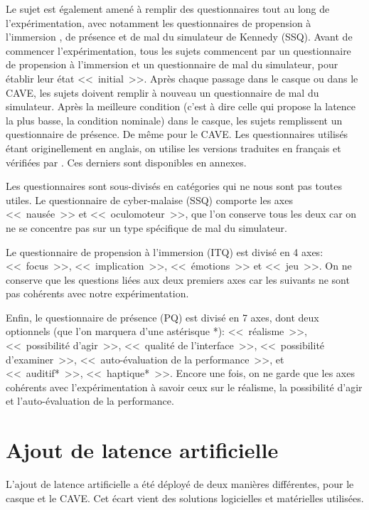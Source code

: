 	\par Le sujet est également amené à remplir des questionnaires tout au long de l'expérimentation, avec notamment les questionnaires de propension à l'immersion \citep{witmer_measuring_1998}, de présence \citep{witmer_measuring_1998} et de mal du simulateur de Kennedy (SSQ). Avant de commencer l'expérimentation, tous les sujets commencent par un questionnaire de propension à l'immersion et un questionnaire de mal du simulateur, pour établir leur état <<~initial~>>. Après chaque passage dans le casque ou dans le CAVE, les sujets doivent remplir à nouveau un questionnaire de mal du simulateur. Après la meilleure condition (c'est à dire celle qui propose la latence la plus basse, la condition nominale) dans le casque, les sujets remplissent un questionnaire de présence. De même pour le CAVE. Les questionnaires utilisés étant originellement en anglais, on utilise les versions traduites en français et vérifiées par \cite{bouchard_revising_2007, bouchard_side_2009, bouchard_exploring_2011}. Ces derniers sont disponibles en annexes.
	
	\par Les questionnaires sont sous-divisés en catégories qui ne nous sont pas toutes utiles. Le questionnaire de cyber-malaise (SSQ) comporte les axes <<~nausée~>> et <<~oculomoteur~>>, que l'on conserve tous les deux car on ne se concentre pas sur un type spécifique de mal du simulateur.
	
	\par Le questionnaire de propension à l'immersion (ITQ) est divisé en 4 axes: <<~focus~>>, <<~implication~>>, <<~émotions~>> et <<~jeu~>>. On ne conserve que les questions liées aux deux premiers axes car les suivants ne sont pas cohérents avec notre expérimentation.
	
	\par Enfin, le questionnaire de présence (PQ) est divisé en 7 axes, dont deux optionnels (que l'on marquera d'une astérisque *): <<~réalisme~>>, <<~possibilité d'agir~>>, <<~qualité de l'interface~>>, <<~possibilité d'examiner~>>, <<~auto-évaluation de la performance~>>, et <<~auditif*~>>, <<~haptique*~>>. Encore une fois, on ne garde que les axes cohérents avec l'expérimentation à savoir ceux sur le réalisme, la possibilité d'agir et l'auto-évaluation de la performance.
		
	\section{Ajout de latence artificielle}
	\label{sec:ajout_latence_artificielle}
	\par L'ajout de latence artificielle a été déployé de deux manières différentes, pour le casque et le CAVE. Cet écart vient des solutions logicielles et matérielles utilisées.
	
